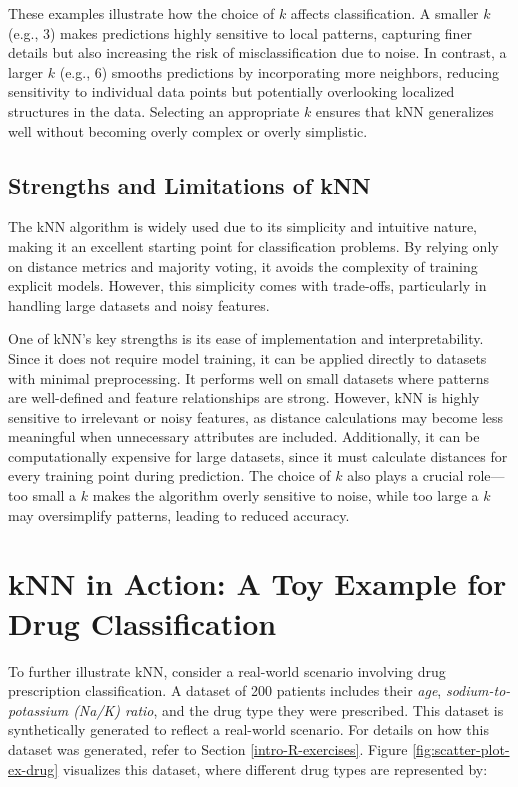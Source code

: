 \documentclass[
  11pt,
]{book}
\theoremstyle{definition}
\theoremstyle{definition}
\theoremstyle{definition}
\theoremstyle{definition}
\theoremstyle{remark}
\begin{document}
These examples illustrate how the choice of \(k\) affects classification. A smaller \(k\) (e.g., 3) makes predictions highly sensitive to local patterns, capturing finer details but also increasing the risk of misclassification due to noise. In contrast, a larger \(k\) (e.g., 6) smooths predictions by incorporating more neighbors, reducing sensitivity to individual data points but potentially overlooking localized structures in the data. Selecting an appropriate \(k\) ensures that kNN generalizes well without becoming overly complex or overly simplistic.

\subsection*{Strengths and Limitations of kNN}\label{strengths-and-limitations-of-knn}


The kNN algorithm is widely used due to its simplicity and intuitive nature, making it an excellent starting point for classification problems. By relying only on distance metrics and majority voting, it avoids the complexity of training explicit models. However, this simplicity comes with trade-offs, particularly in handling large datasets and noisy features.

One of kNN's key strengths is its ease of implementation and interpretability. Since it does not require model training, it can be applied directly to datasets with minimal preprocessing. It performs well on small datasets where patterns are well-defined and feature relationships are strong. However, kNN is highly sensitive to irrelevant or noisy features, as distance calculations may become less meaningful when unnecessary attributes are included. Additionally, it can be computationally expensive for large datasets, since it must calculate distances for every training point during prediction. The choice of \(k\) also plays a crucial role---too small a \(k\) makes the algorithm overly sensitive to noise, while too large a \(k\) may oversimplify patterns, leading to reduced accuracy.

\section*{kNN in Action: A Toy Example for Drug Classification}\label{knn-in-action-a-toy-example-for-drug-classification}


To further illustrate kNN, consider a real-world scenario involving drug prescription classification. A dataset of 200 patients includes their \emph{age}, \emph{sodium-to-potassium (Na/K) ratio}, and the drug type they were prescribed. This dataset is synthetically generated to reflect a real-world scenario. For details on how this dataset was generated, refer to Section \ref{intro-R-exercises}. Figure \ref{fig:scatter-plot-ex-drug} visualizes this dataset, where different drug types are represented by:
\end{document}

